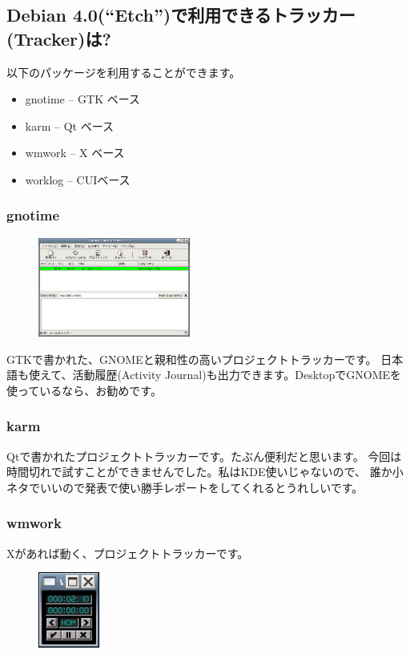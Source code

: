 \documentclass[mingoth,a4paper]{jsarticle}
\begin{document}
\subsection{Debian 4.0(“Etch”)で利用できるトラッカー(Tracker)は?}
以下のパッケージを利用することができます。

\begin{itemize}
 \item  gnotime -- GTK ベース
 \item  karm -- Qt ベース
 \item  wmwork -- X ベース
 \item  worklog -- CUIベース
\end{itemize}

\subsubsection{gnotime}
\begin{figure}\includegraphics[width=5cm]{image200704/gnotime.png}\end{figure}
GTKで書かれた、GNOMEと親和性の高いプロジェクトトラッカーです。
日本語も使えて、活動履歴(Activity Journal)も出力できます。DesktopでGNOMEを使っているなら、お勧めです。

\subsubsection{karm}
Qtで書かれたプロジェクトトラッカーです。たぶん便利だと思います。
今回は時間切れで試すことができませんでした。私はKDE使いじゃないので、
誰か小ネタでいいので発表で使い勝手レポートをしてくれるとうれしいです。

\subsubsection{wmwork}

Xがあれば動く、プロジェクトトラッカーです。

\begin{figure}\includegraphics[width=2cm]{image200704/wmwork.png}\end{figure}
\end{document}
